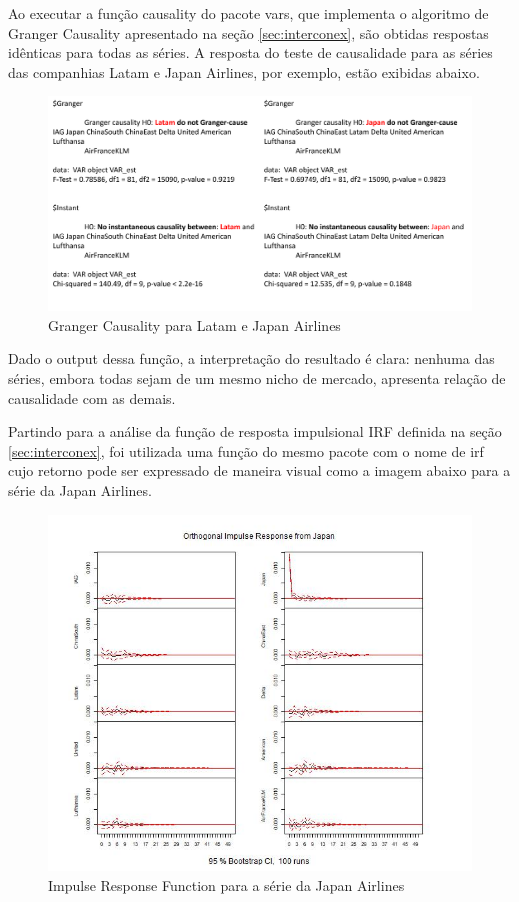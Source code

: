 \documentclass[12pt]{article}
\begin{document}
	Ao executar a função \textrm{causality} do pacote \textrm{vars}, que implementa o algoritmo de \textrm{Granger Causality} apresentado na seção \ref{sec:interconex}, são obtidas respostas idênticas para todas as séries. A resposta do teste de causalidade para as séries das companhias Latam e Japan Airlines, por exemplo, estão exibidas abaixo.
	
	\begin{figure}[H]
		\centering
		\includegraphics[width=0.9\linewidth]{Imagens/GrangerCausality}
		\caption{Granger Causality para Latam e Japan Airlines}
		\label{fig:grangercausality}
	\end{figure}
	
	Dado o output dessa função, a interpretação do resultado é clara: nenhuma das séries, embora todas sejam de um mesmo nicho de mercado, apresenta relação de causalidade com as demais.
	
	Partindo para a análise da função de resposta impulsional \textrm{IRF} definida na seção \ref{sec:interconex}, foi utilizada uma função do mesmo pacote com o nome de \textrm{irf} cujo retorno pode ser expressado de maneira visual como a imagem abaixo para a série da Japan Airlines.
	
	\begin{figure}[H]
		\centering
		\includegraphics[width=0.9\linewidth]{Imagens/IRF_Japan}
		\caption{Impulse Response Function para a série da Japan Airlines}
		\label{fig:irfjapan}
	\end{figure}
	
\end{document}
